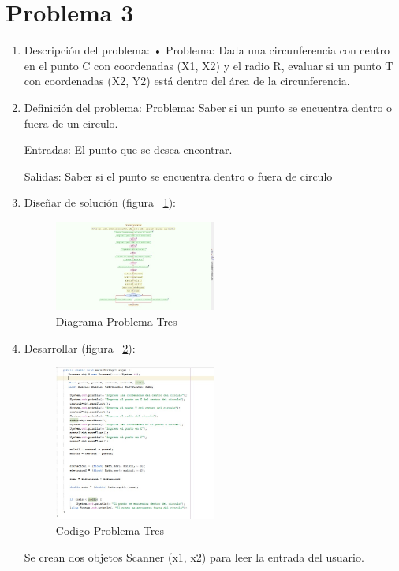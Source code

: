\documentclass{IEEEcsmag}
\begin{document}
\section{Problema 3}
\begin{enumerate}

\item Descripción del problema:
•	Problema: Dada una circunferencia con centro en el punto C con coordenadas (X1, X2) y el radio R, evaluar si un punto T con coordenadas (X2, Y2) está dentro del área de la circunferencia.

\item Definición del problema:
Problema: Saber si un punto se encuentra dentro o fuera de un circulo.

Entradas: El punto que se desea encontrar.

Salidas: Saber si el punto se encuentra dentro o fuera de circulo 

\item Diseñar de solución (figura ~\ref{fig:diagramaP3}):
\begin{figure}
\caption{Diagrama Problema Tres}
\centerline{\includegraphics[width=0.5\textwidth]{./latex-imagenes/diagramaProb3.jpg}}
\vspace*{7pt}
\label{fig:diagramaP3}
\end{figure}

\item Desarrollar  (figura ~\ref{fig:codigoP3}):

\begin{figure}
\caption{Codigo Problema Tres}
\centerline{\includegraphics[width=0.5\textwidth]{./latex-imagenes/codigoprob3.jpg}}
\vspace*{7pt}
\label{fig:codigoP3}
\end{figure}
Se crean dos objetos Scanner (x1, x2) para leer la entrada del usuario. 


\end{enumerate}
\end{document}
